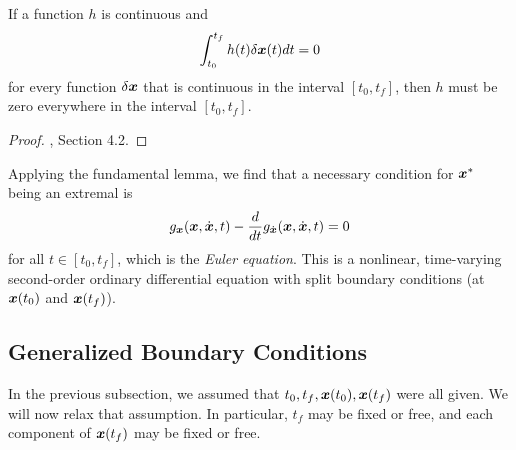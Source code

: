 \begin{lemma}
If a function $h$ is continuous and 
\begin{equation}
    \int_{t_0}^{t_f} h(t) \delta \bm{x}(t) dt = 0
\end{equation}
for every function $\delta \bm{x}$ that is continuous in the interval $[t_0,t_f]$, then $h$ must be zero everywhere in the interval $[t_0,t_f]$.
\end{lemma}

\begin{proof}
\cite{kirk2012optimal}, Section 4.2.
\end{proof}

Applying the fundamental lemma, we find that a necessary condition for $\bm{x}^*$ being an extremal is 
\begin{equation}
    g_{\bm{x}}(\bm{x},\dot{\bm{x}},t) - \frac{d}{dt} g_{\dot{\bm{x}}}(\bm{x},\dot{\bm{x}},t) = 0
\end{equation}
for all $t \in [t_0, t_f]$, which is the \textit{Euler equation}. This is a nonlinear, time-varying second-order ordinary differential equation with split boundary conditions (at $\bm{x}(t_0)$ and $\bm{x}(t_f)$).

\subsection{Generalized Boundary Conditions}

In the previous subsection, we assumed that $t_0, t_f, \bm{x}(t_0), \bm{x}(t_f)$ were all given. We will now relax that assumption. In particular, $t_f$ may be fixed or free, and each component of $\bm{x}(t_f)$ may be fixed or free. 

